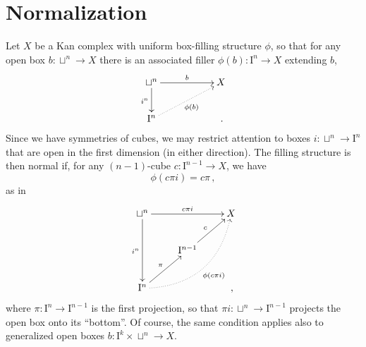 \documentclass[12pt]{article}
\newcommand{\I}{\ensuremath{\mathrm{I}}}
\theoremstyle{remark}
\theoremstyle{definition}
\begin{document}
\section{Normalization}


Let $X$ be a Kan complex with uniform box-filling structure $\phi$, so that for any open box $b: \sqcup^n \to X$ there is an associated filler $\phi(b) : \I^n \to X$ extending $b$,
\[
\xymatrix{
\sqcup^n \ar[d]_{i^n} \ar[rr]^-{b} && X\\
\I^n \ar@{..>}[urr]_{\phi(b)} &&\,.
}
\]
Since we have symmetries of cubes, we may restrict attention to boxes $i : \sqcup^n \to \I^n$ that are open in the first dimension (in either direction).  The filling structure is then normal if, for any $(n-1)$-cube $c : \I^{n-1}\to X$, we have
\[
\phi(c\pi i) = c\pi\,,
\]
as in
\[
\xymatrix{
\sqcup^n \ar[dd]_{i^n} \ar[rr]^-{c\pi i} && X\\
	& \I^{n-1} \ar[ur]^c & \\
\I^n  \ar[ru]^{\pi} \ar@/{}_{2pc}/@{..>}[rruu]_{\phi(c\pi i)} &&\,,
}
\]
where $\pi : \I^n \to \I^{n-1}$ is the first projection, so that   $\pi i : \sqcup^n \to \I^{n-1}$ projects the open box onto its ``bottom''.  
Of course, the same condition applies also to generalized open boxes $b: \I^k\times\sqcup^n \to X$.
\end{document}
